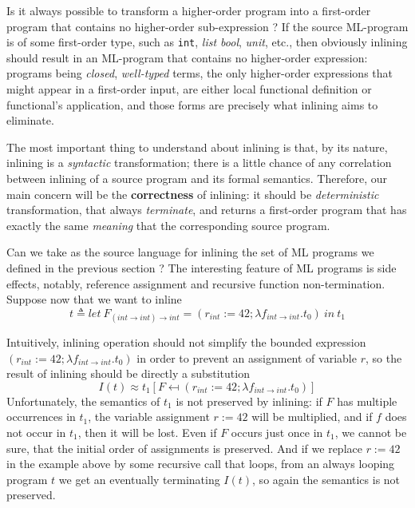 \documentclass[a4paper,11pt,oneside]{article}
\theoremstyle{plain}
\newcommand{\tmlet}[3]{let~#1=#2~in~#3}
\newcommand{\tmsbst}[3]{#1 [#2 \mapsfrom #3] }
\begin{document}
Is it always possible to transform a higher-order program into a first-order program that contains no higher-order sub-expression ? If the source ML-program is of some first-order type,  such as \texttt{int}, \textit{list bool}, \textit{unit}, etc., then obviously inlining should result in an ML-program that contains no higher-order expression: programs being \textit{closed}, \textit{well-typed} terms, the only higher-order expressions that might appear in a first-order input, are either local functional definition or functional's application, and those forms are precisely what inlining aims to eliminate.  

The most important thing to understand about inlining is that, by its nature, inlining is a \textit{syntactic} transformation; there is a little chance of any correlation between inlining of a source program and its formal semantics. Therefore, our main concern will be the \textbf{correctness} of inlining: it  should be \textit{deterministic} transformation, that always \textit{terminate}, and returns a first-order program that has exactly the same \textit{meaning} that the corresponding source program. 

Can we take as the source language for inlining the set of ML programs we defined in the previous section ? The interesting feature of ML programs is side effects, notably, reference assignment and recursive function non-termination. Suppose now that we want to inline 
$$t \triangleq \tmlet{F_{(int \rightarrow int) \rightarrow int}}{(r_{int}:= 42; \lambda f_{int \rightarrow int}. t_0)}{t_1} $$


Intuitively, inlining operation should not simplify the bounded expression 
$(r_{int}:= 42; \lambda f_{int \rightarrow int}. t_0)$ in order to prevent an assignment of variable $r$, so the result of inlining should be directly a substitution 
$$ I(t) \approx \tmsbst{t_1}{F}{(r_{int}:= 42; \lambda f_{int \rightarrow int}. t_0)} $$
Unfortunately, the semantics of $t_1$ is not preserved by inlining:  if $F$ has multiple occurrences in $t_1$, the variable assignment $r:=42$ will be multiplied, and if $f$ does not occur in $t_1$, then it will be lost. Even if $F$ occurs just once in $t_1$, we cannot be sure, that the initial order of assignments is preserved. And if we replace $r:=42$ in the example above by some recursive call that loops, from an always looping program $t$ we get an eventually terminating $I(t)$, so again the semantics is not preserved.
\end{document}
